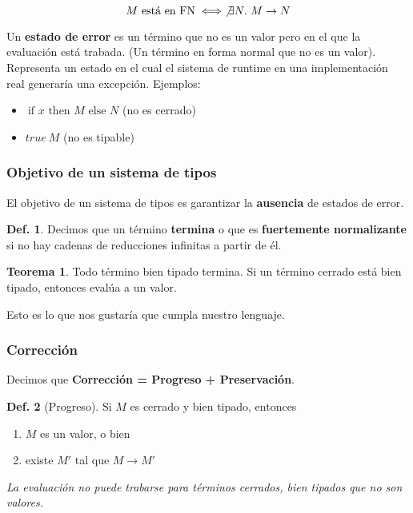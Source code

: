\documentclass{report}
\theoremstyle{definition} %
\newtheorem{theorem}{Teorema}[chapter]
\newtheorem{definition}{Def.}[chapter]
\newcommand{\ifte}[3]{\ \text{if } #1 \text{ then } #2 \text{ else } #3}
\newcommand{\app}[2]{#1 \ #2} %
\newcommand{\reduces}{\to}
\newcommand{\reduce}[2]{#1 \reduces #2}
\begin{document}
\[
    M \text{ está en FN} \iff \not\exists N .\ M \reduces N
\]

Un \textbf{estado de error} es un término que no es un valor pero en el que la
evaluación está trabada. (Un término en forma normal que no es un valor).
Representa un estado en el cual el sistema de runtime en una implementación real
generaría una excepción. Ejemplos:

\begin{itemize}
    \item $\ifte{x}{M}{N}$ (no es cerrado)
    \item $\app{true}{M}$ (no es tipable)
\end{itemize}

\subsubsection{Objetivo de un sistema de tipos}

El objetivo de un sistema de tipos es garantizar la \textbf{ausencia} de estados
de error.

\begin{definition}
    Decimos que un término \textbf{termina} o que es \textbf{fuertemente
normalizante} si no hay cadenas de reducciones infinitas a partir de él.
\end{definition}

\begin{theorem}
    Todo término bien tipado termina. Si un término cerrado está bien tipado,
    entonces evalúa a un valor.
\end{theorem}

Esto es lo que nos gustaría que cumpla nuestro lenguaje.

\subsubsection{Corrección}\label{sec:correccion}

Decimos que \textbf{Corrección = Progreso + Preservación}.

\begin{definition}[Progreso]
    Si $M$ es cerrado y bien tipado, entonces
    \begin{enumerate}
        \item $M$ es un valor, o bien
        \item existe $M'$ tal que $\reduce{M}{M'}$
    \end{enumerate}

    \textit{La evaluación no puede trabarse para términos cerrados, bien tipados que no son valores.}
\end{definition}
\end{document}
